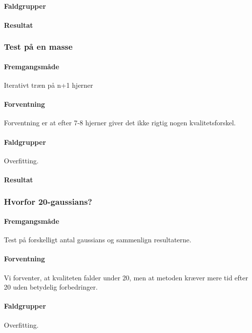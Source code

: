 \paragraph{Faldgrupper}


\paragraph{Resultat}

\subsubsection{Test på en masse}
\paragraph{Fremgangsmåde}
Iterativt træn på n+1 hjerner

\paragraph{Forventning}
Forventning er at efter 7-8 hjerner giver det ikke rigtig nogen
kvalitetsforskel.

\paragraph{Faldgrupper}
Overfitting. 


\paragraph{Resultat}

\subsubsection{Hvorfor 20-gaussians?}

\paragraph{Fremgangsmåde}
Test på forskelligt antal gaussians og sammenlign resultaterne.

\paragraph{Forventning}
Vi forventer, at kvaliteten falder under 20, men at metoden kræver mere tid
efter 20 uden betydelig forbedringer.

\paragraph{Faldgrupper}
Overfitting. 

